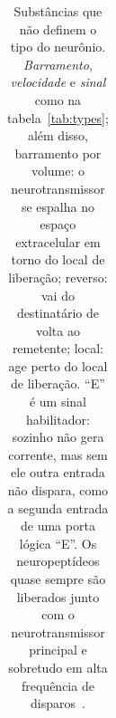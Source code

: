 \begin{table}[t]
\begin{tabular}{>{\raggedright}p{2.25cm}>{\raggedright}p{2.8cm}>{\raggedright}p{1.8cm}>{\raggedright}p{1.5cm}>{\centering}p{0.8cm}>{\raggedright\arraybackslash}p{4.3cm}}
\bottomrule
\end{tabular}
\caption{Substâncias que não definem o tipo do neurônio. \emph{Barramento}, \emph{velocidade} e \emph{sinal} como na tabela~\ref{tab:types}; além disso, barramento por volume: o neurotransmissor se espalha no espaço extracelular em torno do local de liberação; reverso: vai do destinatário de volta ao remetente; local: age perto do local de liberação. ``E'' é um sinal habilitador: sozinho não gera corrente, mas sem ele outra entrada não dispara, como a segunda entrada de uma porta lógica ``E''. Os neuropeptídeos quase sempre são liberados junto com o neurotransmissor principal e sobretudo em alta frequência de disparos~\cite{vandenPol2012}.}
\label{tab:othermediators}
\end{table}
